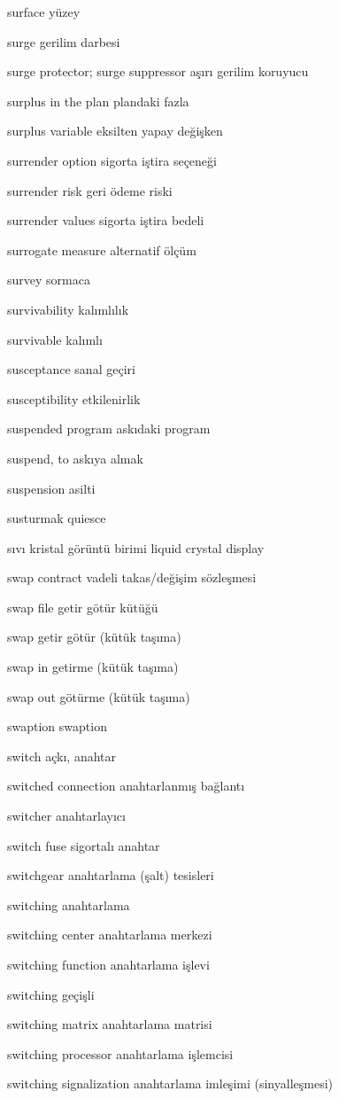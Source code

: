 \documentclass[12pt,fleqn]{article}\usepackage{../../common}
\begin{document}
surface yüzey

surge gerilim darbesi

surge protector; surge suppressor aşırı gerilim koruyucu

surplus in the plan plandaki fazla

surplus variable eksilten yapay değişken

surrender option sigorta iştira seçeneği

surrender risk geri ödeme riski

surrender values sigorta iştira bedeli

surrogate measure alternatif ölçüm

survey sormaca

survivability kalımlılık

survivable kalımlı

susceptance sanal geçiri

susceptibility etkilenirlik

suspended program askıdaki program

suspend, to askıya almak

suspension asilti

susturmak quiesce

sıvı kristal görüntü birimi liquid crystal display

swap contract vadeli takas/değişim sözleşmesi

swap file getir götür kütüğü

swap getir götür (kütük taşıma)

swap in getirme (kütük taşıma)

swap out götürme (kütük taşıma)

swaption swaption

switch açkı, anahtar

switched connection anahtarlanmış bağlantı

switcher anahtarlayıcı

switch fuse sigortalı anahtar

switchgear anahtarlama (şalt) tesisleri

switching anahtarlama

switching center anahtarlama merkezi

switching function anahtarlama işlevi

switching geçişli

switching matrix anahtarlama matrisi

switching processor anahtarlama işlemcisi

switching signalization anahtarlama imleşimi (sinyalleşmesi)
\end{document}
